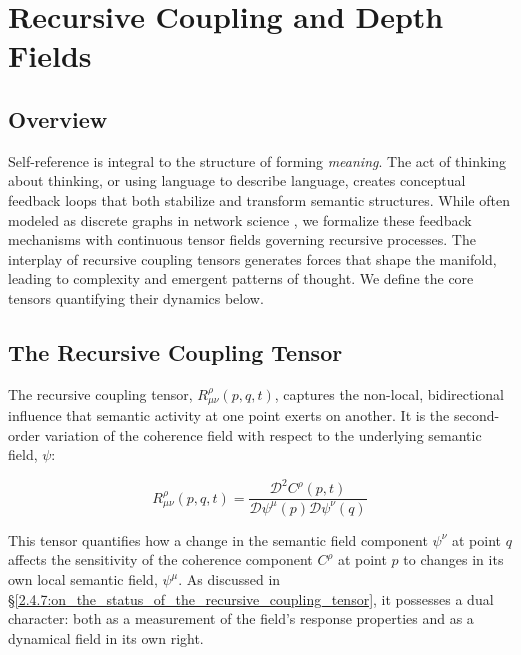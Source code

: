 \chapter{Recursive Coupling and Depth Fields}
\label{4:recursive_coupling_and_depth_fields}


\section{Overview}
\label{4.1:overview}

Self-reference is integral to the structure of forming \textit{meaning}. The act of thinking about thinking, or using language to describe language, creates conceptual feedback loops that both stabilize and transform semantic structures. While often modeled as discrete graphs in network science \autocite{Barabasi2016}, we formalize these feedback mechanisms with continuous tensor fields governing recursive processes. The interplay of recursive coupling tensors generates forces that shape the manifold, leading to complexity and emergent patterns of thought. We define the core tensors quantifying their dynamics below.


\section{The Recursive Coupling Tensor}
\label{4.2:the_recursive_coupling_tensor}

The recursive coupling tensor, \(R^\rho_{\mu\nu}(p, q, t)\), captures the non-local, bidirectional influence that semantic activity at one point exerts on another. It is the second-order variation of the coherence field with respect to the underlying semantic field, \(\psi\):

\begin{equation}
R^\rho_{\mu\nu}(p, q, t) = \frac{\mathcal{D}^2 C^\rho(p,t)}{\mathcal{D} \psi^\mu(p) \mathcal{D} \psi^\nu(q)}
\end{equation}

This tensor quantifies how a change in the semantic field component \(\psi^\nu\) at point \(q\) affects the sensitivity of the coherence component \(C^\rho\) at point \(p\) to changes in its own local semantic field, \(\psi^\mu\). As discussed in \S\ref{2.4.7:on_the_status_of_the_recursive_coupling_tensor}, it possesses a dual character: both as a measurement of the field's response properties and as a dynamical field in its own right.

